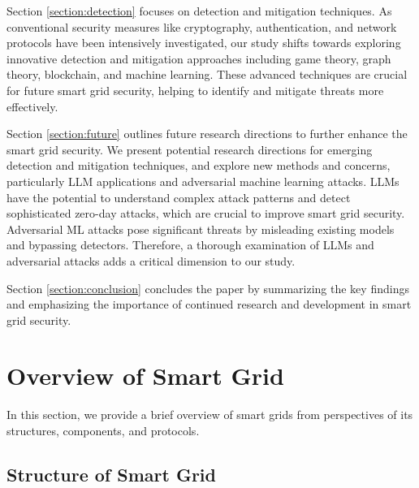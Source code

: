 \documentclass[10pt, journal]{IEEEtran}
\begin{document}
Section \ref{section:detection} focuses on detection and mitigation techniques. As conventional security measures like cryptography, authentication, and network protocols have been intensively investigated, our study shifts towards exploring innovative detection and mitigation approaches including game theory, graph theory, blockchain, and machine learning. These advanced techniques are crucial for future smart grid security, helping to identify and mitigate threats more effectively.

Section \ref{section:future} outlines future research directions to further enhance the smart grid security. We present potential research directions for emerging detection and mitigation techniques, and explore new methods and concerns, particularly LLM applications and adversarial machine learning attacks. LLMs have the potential to understand complex attack patterns and detect sophisticated zero-day attacks, which are crucial to improve smart grid security. Adversarial ML attacks pose significant threats by misleading existing models and bypassing detectors. Therefore, a thorough examination of LLMs and adversarial attacks adds a critical dimension to our study.

Section \ref{section:conclusion} concludes the paper by summarizing the key findings and emphasizing the importance of continued research and development in smart grid security.



\section{Overview of Smart Grid}
\label{section:Overview}

In this section, we provide a brief overview of smart grids from perspectives of its structures, components, and protocols.

\subsection{Structure of Smart Grid}
\end{document}
